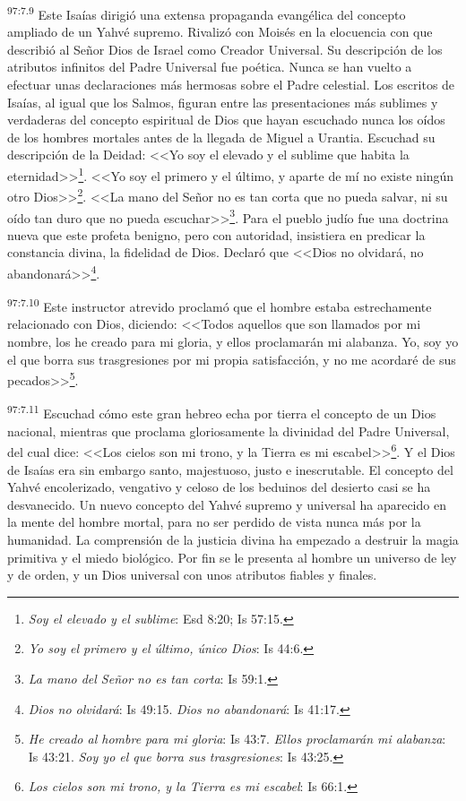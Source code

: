 \par
\textsuperscript{97:7.9} Este Isaías dirigió una extensa propaganda evangélica del concepto ampliado de un Yahvé supremo. Rivalizó con Moisés en la elocuencia con que describió al Señor Dios de Israel como Creador Universal. Su descripción de los atributos infinitos del Padre Universal fue poética. Nunca se han vuelto a efectuar unas declaraciones más hermosas sobre el Padre celestial. Los escritos de Isaías, al igual que los Salmos, figuran entre las presentaciones más sublimes y verdaderas del concepto espiritual de Dios que hayan escuchado nunca los oídos de los hombres mortales antes de la llegada de Miguel a Urantia. Escuchad su descripción de la Deidad: <<Yo soy el elevado y el sublime que habita la eternidad>>\footnote{\textit{Soy el elevado y el sublime}: Esd 8:20; Is 57:15.}. <<Yo soy el primero y el último, y aparte de mí no existe ningún otro Dios>>\footnote{\textit{Yo soy el primero y el último, único Dios}: Is 44:6.}. <<La mano del Señor no es tan corta que no pueda salvar, ni su oído tan duro que no pueda escuchar>>\footnote{\textit{La mano del Señor no es tan corta}: Is 59:1.}. Para el pueblo judío fue una doctrina nueva que este profeta benigno, pero con autoridad, insistiera en predicar la constancia divina, la fidelidad de Dios. Declaró que <<Dios no olvidará, no abandonará>>\footnote{\textit{Dios no olvidará}: Is 49:15. \textit{Dios no abandonará}: Is 41:17.}.

\par
\textsuperscript{97:7.10} Este instructor atrevido proclamó que el hombre estaba estrechamente relacionado con Dios, diciendo: <<Todos aquellos que son llamados por mi nombre, los he creado para mi gloria, y ellos proclamarán mi alabanza. Yo, soy yo el que borra sus trasgresiones por mi propia satisfacción, y no me acordaré de sus pecados>>\footnote{\textit{He creado al hombre para mi gloria}: Is 43:7. \textit{Ellos proclamarán mi alabanza}: Is 43:21. \textit{Soy yo el que borra sus trasgresiones}: Is 43:25.}.

\par
\textsuperscript{97:7.11} Escuchad cómo este gran hebreo echa por tierra el concepto de un Dios nacional, mientras que proclama gloriosamente la divinidad del Padre Universal, del cual dice: <<Los cielos son mi trono, y la Tierra es mi escabel>>\footnote{\textit{Los cielos son mi trono, y la Tierra es mi escabel}: Is 66:1.}. Y el Dios de Isaías era sin embargo santo, majestuoso, justo e inescrutable. El concepto del Yahvé encolerizado, vengativo y celoso de los beduinos del desierto casi se ha desvanecido. Un nuevo concepto del Yahvé supremo y universal ha aparecido en la mente del hombre mortal, para no ser perdido de vista nunca más por la humanidad. La comprensión de la justicia divina ha empezado a destruir la magia primitiva y el miedo biológico. Por fin se le presenta al hombre un universo de ley y de orden, y un Dios universal con unos atributos fiables y finales.

